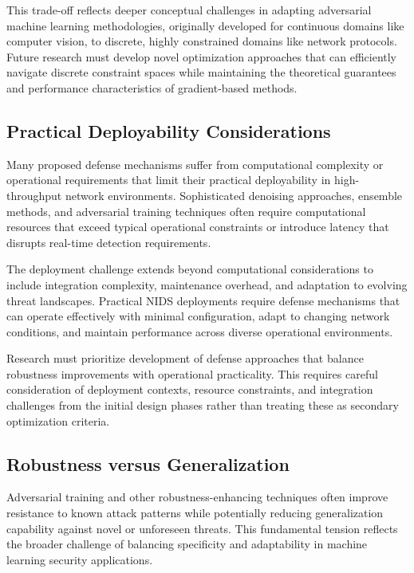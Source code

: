 This trade-off reflects deeper conceptual challenges in adapting adversarial machine learning methodologies, originally developed for continuous domains like computer vision, to discrete, highly constrained domains like network protocols. Future research must develop novel optimization approaches that can efficiently navigate discrete constraint spaces while maintaining the theoretical guarantees and performance characteristics of gradient-based methods.

\subsection{Practical Deployability Considerations}

Many proposed defense mechanisms suffer from computational complexity or operational requirements that limit their practical deployability in high-throughput network environments. Sophisticated denoising approaches, ensemble methods, and adversarial training techniques often require computational resources that exceed typical operational constraints or introduce latency that disrupts real-time detection requirements.

The deployment challenge extends beyond computational considerations to include integration complexity, maintenance overhead, and adaptation to evolving threat landscapes. Practical NIDS deployments require defense mechanisms that can operate effectively with minimal configuration, adapt to changing network conditions, and maintain performance across diverse operational environments.

Research must prioritize development of defense approaches that balance robustness improvements with operational practicality. This requires careful consideration of deployment contexts, resource constraints, and integration challenges from the initial design phases rather than treating these as secondary optimization criteria.

\subsection{Robustness versus Generalization}

Adversarial training and other robustness-enhancing techniques often improve resistance to known attack patterns while potentially reducing generalization capability against novel or unforeseen threats. This fundamental tension reflects the broader challenge of balancing specificity and adaptability in machine learning security applications.

